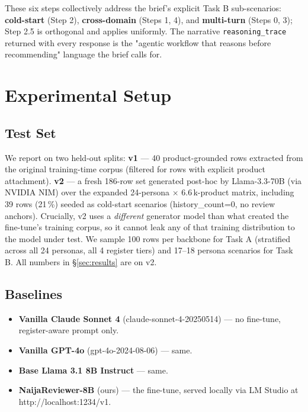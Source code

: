 \documentclass[sigconf,nonacm,balance]{acmart}
\begin{document}
These six steps collectively address the brief's explicit Task B
sub-scenarios: \textbf{cold-start} (Step 2), \textbf{cross-domain}
(Steps 1, 4), and \textbf{multi-turn} (Steps 0, 3); Step 2.5 is
orthogonal and applies uniformly. The narrative
\texttt{reasoning\_trace} returned with every response is the
"agentic workflow that reasons before recommending" language the
brief calls for.

\section{Experimental Setup}
\label{sec:experiments}

\subsection{Test Set}

We report on two held-out splits:
\textbf{v1} --- 40 product-grounded rows extracted from the original
training-time corpus (filtered for rows with explicit product
attachment).
\textbf{v2} --- a fresh 186-row set generated post-hoc by Llama-3.3-70B
(via NVIDIA NIM) over the expanded 24-persona $\times$ 6.6\,k-product
matrix, including 39 rows (21\,\%) seeded as cold-start scenarios
(\textsf{history\_count}=0, no review anchors). Crucially, v2 uses a
\emph{different} generator model than what created the fine-tune's
training corpus, so it cannot leak any of that training distribution to
the model under test. We sample 100 rows per backbone for Task A
(stratified across all 24 personas, all 4 register tiers) and 17--18
persona scenarios for Task B. All numbers in §\ref{sec:results} are on v2.

\subsection{Baselines}

\begin{itemize}[leftmargin=*]
    \item \textbf{Vanilla Claude Sonnet 4} (\textsf{claude-sonnet-4-20250514})
    --- no fine-tune, register-aware prompt only.
    \item \textbf{Vanilla GPT-4o} (\textsf{gpt-4o-2024-08-06}) --- same.
    \item \textbf{Base Llama 3.1 8B Instruct} --- same.
    \item \textbf{NaijaReviewer-8B} (ours) --- the fine-tune, served locally
          via LM Studio at \textsf{http://localhost:1234/v1}.
\end{itemize}
\end{document}
